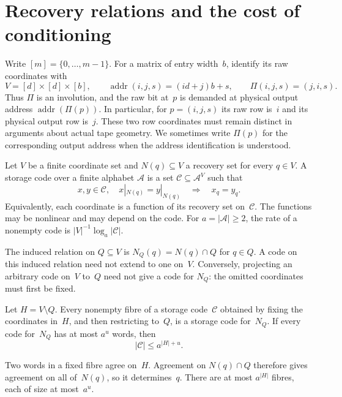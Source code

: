 \section{Recovery relations and the cost of conditioning}\label{sec:preliminaries}

Write $[m]=\{0,\ldots,m-1\}$. For a matrix of entry width~$b$, identify its raw coordinates with
\[
 V=[d]\times[d]\times[b],\qquad
 \operatorname{addr}(i,j,s)=(id+j)b+s,
 \qquad \Pi(i,j,s)=(j,i,s).
\]
Thus $\Pi$ is an involution, and the raw bit at~$p$ is demanded at physical output address $\operatorname{addr}(\Pi(p))$. In particular, for $p=(i,j,s)$ its raw row is~$i$ and its physical output row is~$j$. These two row coordinates must remain distinct in arguments about actual tape geometry. We sometimes write $\Pi(p)$ for the corresponding output address when the address identification is understood.

\begin{definition}\label{def:pre-storage}
Let $V$ be a finite coordinate set and $N(q)\subseteq V$ a recovery set for every $q\in V$. A storage code over a finite alphabet $\mathcal A$ is a set $\mathcal C\subseteq\mathcal A^V$ such that
\[
 x,y\in\mathcal C,\quad x|_{N(q)}=y|_{N(q)}
 \quad\Longrightarrow\quad x_q=y_q.
\]
Equivalently, each coordinate is a function of its recovery set on~$\mathcal C$. The functions may be nonlinear and may depend on the code. For $a=|\mathcal A|\ge2$, the rate of a nonempty code is $|V|^{-1}\log_a|\mathcal C|$.
\end{definition}

The induced relation on $Q\subseteq V$ is $N_Q(q)=N(q)\cap Q$ for $q\in Q$. A code on this induced relation need not extend to one on~$V$. Conversely, projecting an arbitrary code on~$V$ to~$Q$ need not give a code for $N_Q$: the omitted coordinates must first be fixed.

\begin{lemma}\label{lem:pre-conditioning}
Let $H=V\setminus Q$. Every nonempty fibre of a storage code~$\mathcal C$ obtained by fixing the coordinates in~$H$, and then restricting to~$Q$, is a storage code for~$N_Q$. If every code for~$N_Q$ has at most $a^u$ words, then
\[
 |\mathcal C|\le a^{|H|+u}.
\]
\end{lemma}
\begin{outline}
Two words in a fixed fibre agree on~$H$. Agreement on $N(q)\cap Q$ therefore gives agreement on all of~$N(q)$, so it determines~$q$. There are at most $a^{|H|}$ fibres, each of size at most~$a^u$.
\end{outline}

